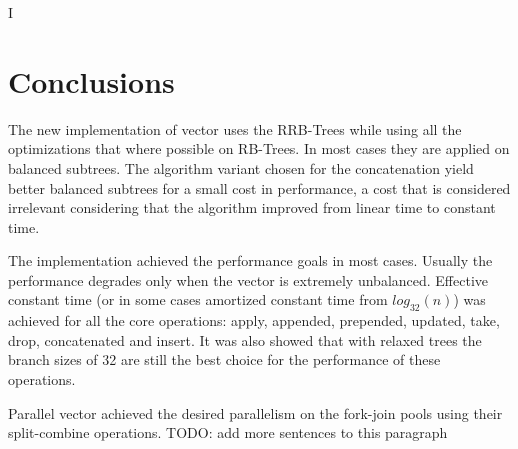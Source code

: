 I%

\chapter{Conclusions} %

\label{Conclusions} %




The new implementation of vector uses the RRB-Trees while using all the optimizations that where possible on RB-Trees. In most cases they are applied on balanced subtrees. The algorithm variant chosen for the concatenation yield better balanced subtrees for a small cost in performance, a cost that is considered irrelevant considering that the algorithm improved from linear time to constant time.

The implementation achieved the performance goals in most cases. Usually the performance degrades only when the vector is extremely unbalanced. Effective constant time (or in some cases amortized constant time from $log_{32}(n)$) was achieved for all the core operations: apply, appended, prepended, updated, take, drop, concatenated and insert. It was also showed that with relaxed trees the branch sizes of 32 are still the best choice for the performance of these operations.

Parallel vector achieved the desired parallelism on the fork-join pools using their split-combine operations. 
\color{red} TODO: add more sentences to this paragraph \color{black}

